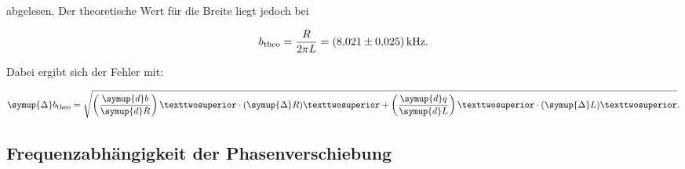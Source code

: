 abgelesen.
Der theoretische Wert für die Breite liegt jedoch bei 

\begin{equation*}
b_\text{theo} = \frac{R}{2\pi L} = \SI{8.021+-0.025}{\kilo\hertz}.
\end{equation*}

Dabei ergibt sich der Fehler mit: 

\begin{equation*}
\symup{\Delta}b_\text{theo} = \sqrt{\left(\frac{\symup{d}b}{\symup{d}R}\right)²\cdot(\symup{\Delta}R)² +
\left(\frac{\symup{d}q}{\symup{d}L}\right)²\cdot(\symup{\Delta}L)²}.
\end{equation*}

\subsection{Frequenzabhängigkeit der Phasenverschiebung}